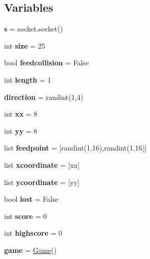 \subsection*{Variables}
\begin{DoxyCompactItemize}
\item 
\mbox{\label{namespace_snake_a10cc7da73d7488752c4a8222135707a1}} 
{\bfseries s} = socket.\+socket()
\item 
\mbox{\label{namespace_snake_a26464c0ce15e8a65c02d8b1d0e077ea4}} 
int {\bfseries size} = 25
\item 
\mbox{\label{namespace_snake_a3aef21f736569d8b66197f0e7397c801}} 
bool {\bfseries feedcollision} = False
\item 
\mbox{\label{namespace_snake_a3066d1fa56dad61e41bb50f0f85eb79a}} 
int {\bfseries length} = 1
\item 
\mbox{\label{namespace_snake_a27bdeea7ec49893ec1aa7f5e0cc2967e}} 
{\bfseries direction} = randint(1,4)
\item 
\mbox{\label{namespace_snake_a7fab8854941bcbd85234bec6d4879176}} 
int {\bfseries xx} = 8
\item 
\mbox{\label{namespace_snake_a027467285b250e9abb387c2c1326771c}} 
int {\bfseries yy} = 8
\item 
\mbox{\label{namespace_snake_ab110474976787cf3ccef734d19a75630}} 
list {\bfseries feedpoint} = \mbox{[}randint(1,16),randint(1,16)\mbox{]}
\item 
\mbox{\label{namespace_snake_a5007979b981a90f08d3775ef8714c84c}} 
list {\bfseries xcoordinate} = \mbox{[}xx\mbox{]}
\item 
\mbox{\label{namespace_snake_aab72c72a638d0b108981f93348891b18}} 
list {\bfseries ycoordinate} = \mbox{[}yy\mbox{]}
\item 
\mbox{\label{namespace_snake_a0bc14678957b8b5a8dfac41d8e647041}} 
bool {\bfseries lost} = False
\item 
\mbox{\label{namespace_snake_aa277acac43eb5cd735f12bf81f3e94bb}} 
int {\bfseries score} = 0
\item 
\mbox{\label{namespace_snake_ab2b5f6ed36de41b8f318733bc26b93ae}} 
int {\bfseries highscore} = 0
\item 
\mbox{\label{namespace_snake_ac11d51dc9d52703ce138d3b42c094a18}} 
{\bfseries game} = \mbox{\hyperlink{class_snake_1_1_game}{Game}}()
\end{DoxyCompactItemize}


